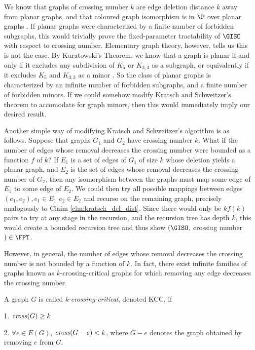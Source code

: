 \documentclass[11pt]{report}
\newcommand{\cross}{\mbox{\emph{cross}}}
\begin{document}
We know that graphs of crossing number $k$ are edge deletion distance $k$ away from planar graphs, and that coloured graph isomorphism is in $\P$ over planar graphs \cite{HopcroftTarjan72} \cite{HopcroftWong74}\cite{Grohe10}. If planar graphs were characterized by a finite number of forbidden subgraphs, this would trivially prove the fixed-parameter tractability of $\GISO$ with respect to crossing number. Elementary graph theory, however, tells us this is not the case. By Kuratowski's Theorem, we know that a graph is planar if and only if it excludes any subdivision of $K_5$ or $K_{3,3}$ as a subgraph, or equivalently if it excludes $K_5$ and $K_{3,3}$ as a minor \cite{Harris08}. So the class of planar graphs is characterized by an infinite number of forbidden subgraphs, and a finite number of forbidden minors. If we could somehow modify Kratsch and Schweitzer's theorem to accomodate for graph minors, then this would immediately imply our desired result.

Another simple way of modifying Kratsch and Schweitzer's algorithm is as follows. Suppose that graphs $G_1$ and $G_2$ have crossing number $k$. What if the number of edges whose removal decreases the crossing number were bounded as a function $f$ of $k$? If $E_1$ is a set of edges of $G_1$ of size $k$ whose deletion yields a planar graph, and $E_2$ is the set of edges whose removal decreases the crossing number of $G_2$, then any isomorphism between the graphs must map some edge of $E_1$ to some edge of $E_2$. We could then try all possible mappings between edges $(e_1,e_2), e_1 \in E_1$ $e_2 \in E_2$ and recurse on the remaining graph, precisely analogously to Claim \ref{clm:kratsch_del_dist}. Since there would only be $kf(k)$ pairs to try at any stage in the recursion, and the recursion tree has depth $k$, this would create a bounded recursion tree and thus show $(\GISO,$ crossing number$)\in\FPT$.

However, in general, the number of edges whose removal decreases the crossing number is not bounded by a function of $k$. In fact, there exist infinite families of graphs known as $k$-crossing-critical graphs for which removing any edge decreases the crossing number.

A graph $G$ is called \emph{k-crossing-critical}, denoted KCC, if 

1. $\cross(G)\geq k$

2. $\forall e \in E(G)$, $\cross(G-e)<k$, where $G-e$ denotes the graph obtained by removing $e$ from $G$. 
\end{document}
